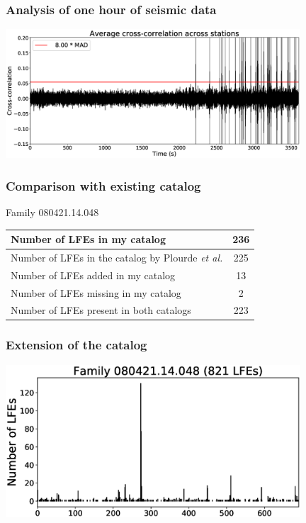\documentclass{beamer}
\begin{document}
	\begin{frame}
		\frametitle{Analysis of one hour of seismic data}
		\begin{center}
			\includegraphics[width=11cm, trim={0cm 0cm 0cm 0cm}, clip]{catalog_SC/20080421_130000.eps}
		\end{center}
	\end{frame}

	\begin{frame}
		\frametitle{Comparison with existing catalog}
		\begin{center}
		Family 080421.14.048

		\vspace{2em}

		\begin{tabular}{| l | c |}
			\hline
			Number of LFEs in my catalog & 236 \\
			\hline
			Number of LFEs in the catalog by Plourde \textit{et al.} & 225 \\
			\hline
			Number of LFEs added in my catalog & 13 \\
			\hline
			Number of LFEs missing in my catalog & 2 \\
			\hline
			Number of LFEs present in both catalogs & 223 \\
			\hline
		\end{tabular}
		\end{center}
	\end{frame}

	\begin{frame}
		\frametitle{Extension of the catalog}
		\begin{center}
			\includegraphics[width=11cm, trim={0cm 0cm 0cm 0cm}, clip]{catalog_SC/08042114048_FAME.eps}
		\end{center}
	\end{frame}
	
\end{document}
